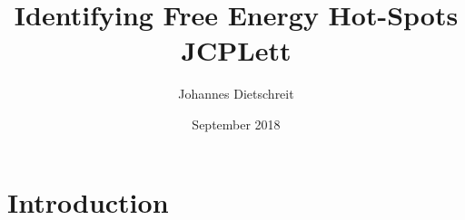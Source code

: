 \documentclass{article}
\title{Identifying Free Energy Hot-Spots JCPLett}
\author{Johannes Dietschreit}
\date{September 2018}
\begin{document}
\maketitle

\section{Introduction}
\end{document}
